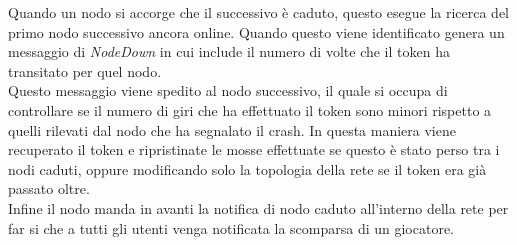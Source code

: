 \documentclass{llncs}
\begin{document}
Quando un nodo si accorge che il successivo è caduto, questo esegue la ricerca del primo nodo successivo ancora online. Quando questo viene identificato genera un messaggio di \emph{NodeDown} in cui include il numero di volte che il token ha transitato per quel nodo.\\
Questo messaggio viene spedito al nodo successivo, il quale si occupa di controllare se il numero di giri che ha effettuato il token sono minori rispetto a quelli rilevati dal nodo che ha segnalato il crash. In questa maniera viene recuperato il token e ripristinate le mosse effettuate se questo è stato perso tra i nodi caduti, oppure modificando solo la topologia della rete se il token era già passato oltre.\\
Infine il nodo manda in avanti la notifica di nodo caduto all'interno della rete per far si che a tutti gli utenti venga notificata la scomparsa di un giocatore.\\
\end{document}
